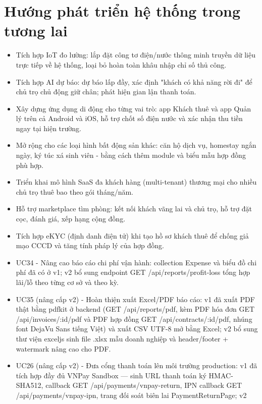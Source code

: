 \section{Hướng phát triển hệ thống trong tương lai}

\begin{itemize}
\item
  Tích hợp IoT đo lường: lắp đặt công tơ điện/nước thông minh truyền dữ
  liệu trực tiếp về hệ thống, loại bỏ hoàn toàn khâu nhập chỉ số thủ
  công.
\item
  Tích hợp AI dự báo: dự báo lấp đầy, xác định "khách có khả năng rời
  đi" để chủ trọ chủ động giữ chân; phát hiện gian lận thanh toán.
\item
  Xây dựng ứng dụng di động cho từng vai trò: app Khách thuê và app Quản
  lý trên cả Android và iOS, hỗ trợ chốt số điện nước và xác nhận thu
  tiền ngay tại hiện trường.
\item
  Mở rộng cho các loại hình bất động sản khác: căn hộ dịch vụ, homestay
  ngắn ngày, ký túc xá sinh viên - bằng cách thêm module và biểu mẫu hợp
  đồng phù hợp.
\item
  Triển khai mô hình SaaS đa khách hàng (multi-tenant) thương mại cho
  nhiều chủ trọ thuê bao theo gói tháng/năm.
\item
  Hỗ trợ marketplace tìm phòng: kết nối khách vãng lai và chủ trọ, hỗ
  trợ đặt cọc, đánh giá, xếp hạng cộng đồng.
\item
  Tích hợp eKYC (định danh điện tử) khi tạo hồ sơ khách thuê để chống
  giả mạo CCCD và tăng tính pháp lý của hợp đồng.
\item
  UC34 - Nâng cao báo cáo chi phí vận hành: collection Expense và biểu
  đồ chi phí đã có ở v1; v2 bổ sung endpoint GET
  /api/reports/profit-loss tổng hợp lãi/lỗ theo từng cơ sở và theo kỳ.
\item
  UC35 (nâng cấp v2) - Hoàn thiện xuất Excel/PDF báo cáo: v1 đã xuất PDF
  thật bằng pdfkit ở backend (GET /api/reports/pdf, kèm PDF hóa đơn GET
  /api/invoices/:id/pdf và PDF hợp đồng GET /api/contracts/:id/pdf,
  nhúng font DejaVu Sans tiếng Việt) và xuất CSV UTF-8 mở bằng Excel; v2
  bổ sung thư viện exceljs sinh file .xlsx mẫu doanh nghiệp và
  header/footer + watermark nâng cao cho PDF.
\item
  UC26 (nâng cấp v2) - Đưa cổng thanh toán lên môi trường production: v1
  đã tích hợp đầy đủ VNPay Sandbox --- sinh URL thanh toán ký
  HMAC-SHA512, callback GET /api/payments/vnpay-return, IPN callback GET
  /api/payments/vnpay-ipn, trang đối soát biên lai PaymentReturnPage; v2

\end{itemize}
